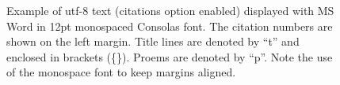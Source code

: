 \documentclass[11pt,a4paper]{article}
\begin{document}
              \begin{figure}[htb]
                \begin{center}
                    \caption{Example of utf-8 text (citations option enabled)
                           displayed with MS Word in 12pt monospaced Consolas font.
                           The citation numbers are shown on the left margin.
                           Title lines are denoted by ``t'' and enclosed in
                           brackets (\{\}).
                           Proems are denoted by ``p''.
                           Note the use of the monospace font to keep
                           margins aligned.}
                \end{center}
              \end{figure}
  \newpage
\end{document}

